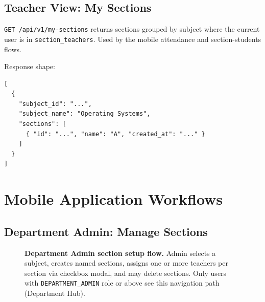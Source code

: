 \documentclass[11pt,a4paper,oneside]{report}
\begin{document}
\section{Teacher View: My Sections}

\texttt{GET /api/v1/my-sections} returns sections grouped by subject where the current user is in \texttt{section\_teachers}. Used by the mobile attendance and section-students flows.

Response shape:
\begin{lstlisting}[caption={My Sections response (conceptual)}]
[
  {
    "subject_id": "...",
    "subject_name": "Operating Systems",
    "sections": [
      { "id": "...", "name": "A", "created_at": "..." }
    ]
  }
]
\end{lstlisting}

\chapter{Mobile Application Workflows}
\label{ch:mobile}

\section{Department Admin: Manage Sections}

\begin{figure}[H]
  \centering
  \caption{%
    \textbf{Department Admin section setup flow.}%
    Admin selects a subject, creates named sections, assigns one or more teachers per section via checkbox modal, and may delete sections. Only users with \texttt{DEPARTMENT\_ADMIN} role or above see this navigation path (Department Hub).
  }
  \label{fig:admin-flow}
\end{figure}
\end{document}
